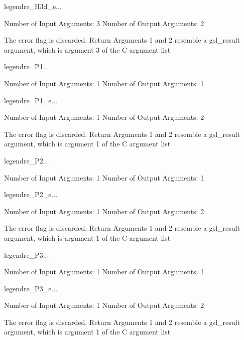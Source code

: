 \begin{funcdesc}{legendre_H3d_e}{...}

    Number of Input  Arguments:  3
    Number of Output Arguments:  2

The error flag is discarded.
Return Arguments 1 and 2 resemble a gsl_result argument,
	which is  argument 3 of the C argument list

\end{funcdesc}

\begin{funcdesc}{legendre_P1}{...}

    Number of Input  Arguments:  1
    Number of Output Arguments:  1
\end{funcdesc}

\begin{funcdesc}{legendre_P1_e}{...}

    Number of Input  Arguments:  1
    Number of Output Arguments:  2

The error flag is discarded.
Return Arguments 1 and 2 resemble a gsl_result argument,
	which is  argument 1 of the C argument list

\end{funcdesc}

\begin{funcdesc}{legendre_P2}{...}

    Number of Input  Arguments:  1
    Number of Output Arguments:  1
\end{funcdesc}

\begin{funcdesc}{legendre_P2_e}{...}

    Number of Input  Arguments:  1
    Number of Output Arguments:  2

The error flag is discarded.
Return Arguments 1 and 2 resemble a gsl_result argument,
	which is  argument 1 of the C argument list

\end{funcdesc}

\begin{funcdesc}{legendre_P3}{...}

    Number of Input  Arguments:  1
    Number of Output Arguments:  1
\end{funcdesc}

\begin{funcdesc}{legendre_P3_e}{...}

    Number of Input  Arguments:  1
    Number of Output Arguments:  2

The error flag is discarded.
Return Arguments 1 and 2 resemble a gsl_result argument,
	which is  argument 1 of the C argument list

\end{funcdesc}

